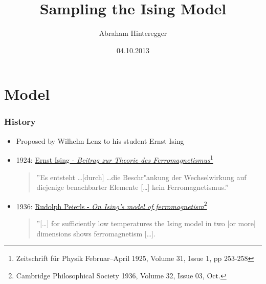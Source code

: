 \documentclass{beamer}
\begin{document}
\title{Sampling the Ising Model}
\author{Abraham Hinteregger}
\date{04.10.2013}
\titlepage
\setcounter{tocdepth}{4}
\section{Model} 
\begin{frame}\frametitle{History} 
\begin{itemize}%
\item Proposed by Wilhelm Lenz to his student Ernst Ising
\item 1924: \href{http://link.springer.com/content/pdf/10.1007 BF02980577.pdf}{Ernst Ising - \textit{Beitrag zur Theorie des Ferromagnetismus}\footnote{Zeitschrift für Physik Februar–April 1925, Volume 31, Issue 1, pp 253-258 }}
\begin{quote}
''Es entsteht \ldots [durch] \ldots die Beschr"ankung der Wechselwirkung auf diejenige  benachbarter Elemente [\ldots] kein Ferromagnetismus.''
\end{quote}
\item 1936: \href{http://journals.cambridge.org/action/displayAbstract?fromPage=online\&aid=2027260}{Rudolph Peierls - \textit{On Ising's model of ferromagnetism}\footnote{Cambridge Philosophical Society 1936, Volume 32, Issue 03, Oct.}}
\begin{quote}
''[\ldots] for sufficiently low temperatures the Ising model in two [or more] dimensions shows ferromagnetism [\ldots].
\end{quote}
\end{itemize}
\end{frame}

\end{document}
